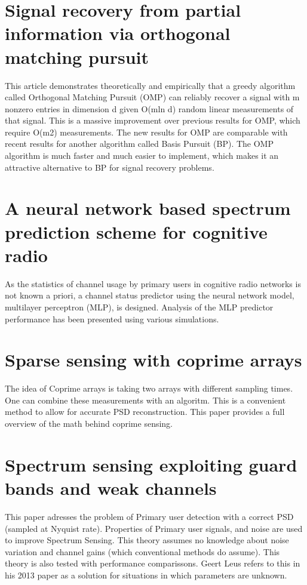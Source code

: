 \documentclass[report, oneside, a4paper, openany]{memoir}
\begin{document}
\section{Signal recovery from partial information via orthogonal matching pursuit \cite{tropp2005signal}}
This article demonstrates theoretically and empirically that a greedy algorithm called
Orthogonal Matching Pursuit (OMP) can reliably recover a signal with m nonzero entries in dimension
d given O(mln d) random linear measurements of that signal. This is a massive improvement
over previous results for OMP, which require O(m2) measurements. The new results for OMP are
comparable with recent results for another algorithm called Basis Pursuit (BP). The OMP algorithm
is much faster and much easier to implement, which makes it an attractive alternative to BP
for signal recovery problems.
\section{A neural network based spectrum prediction scheme for cognitive radio \cite{tumuluru2010neural}}
As the statistics of channel usage by primary users in cognitive radio networks is not known a priori, a channel status predictor using the neural network model, multilayer perceptron (MLP), is designed. Analysis of the MLP predictor performance has been presented using various simulations.
\section{Sparse sensing with coprime arrays \cite{vaidyanathan2010sparse}}
The idea of Coprime arrays is taking two arrays with different sampling times. One can combine these measurements with an algoritm. This is a convenient method to allow for accurate PSD reconstruction. This paper provides a full overview of the math behind coprime sensing.
\section{Spectrum sensing exploiting guard bands and weak channels \cite{vazquez2011spectrum}}
This paper adresses the problem of Primary user detection with a correct PSD (sampled at Nyquist rate). Properties of Primary user signals, and noise are used to improve Spectrum Sensing. This theory assumes no knowledge about noise variation and channel gains (which conventional methods do assume). This theory is also tested with performance comparissons. Geert Leus refers to this in his 2013 paper as a solution for situations in which parameters are unknown. 
\end{document}
